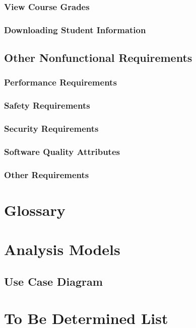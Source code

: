 \documentclass{article}
\begin{document}
\subsubsection{View Course Grades}



\subsubsection{Downloading Student Information}

\subsection{Other Nonfunctional Requirements}

\subsubsection{Performance Requirements}

\subsubsection{Safety Requirements}

\subsubsection{Security Requirements}

\subsubsection{Software Quality Attributes}


\subsubsection{Other Requirements}

\newpage
\appendix


\section{Glossary}


\section{Analysis Models}

\subsection{Use Case Diagram}

\section{To Be Determined List}
\end{document}
